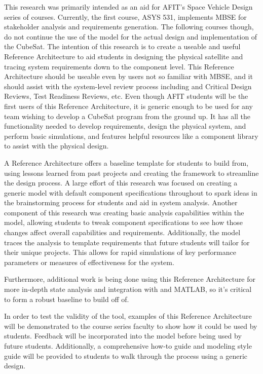 
This research was primarily intended as an aid for AFIT's Space Vehicle Design series of courses. Currently, the first course, ASYS 531, implements MBSE for stakeholder analysis and requirements generation. The following courses though, do not continue the use of the model for the actual design and implementation of the CubeSat. The intention of this research is to create a useable and useful Reference Architecture to aid students in designing the physical satellite and tracing system requirements down to the component level. This Reference Architecture should be useable even by users not so familiar with MBSE, and it should assist with the system-level review process including and Critical Design Reviews, Test Readiness Reviews, etc. Even though AFIT students will be the first users of this Reference Architecture, it is generic enough to be used for any team wishing to develop a CubeSat program from the ground up. It has all the functionality needed to develop requirements, design the physical system, and perform basic simulations, and features helpful resources like a component library to assist with the physical design. 

A Reference Architecture offers a baseline template for students to build from, using lessons learned from past projects and creating the framework to streamline the design process. A large effort of this research was focused on creating a generic model with default component specifications throughout to spark ideas in the brainstorming process for students and aid in system analysis. Another component of this research was creating basic analysis capabilities within the model, allowing students to tweak component specifications to see how those changes affect overall capabilities and requirements. Additionally, the model traces the analysis to template requirements that future students will tailor for their unique projects. This allows for rapid simulations of key performance parameters or measures of effectiveness for the system. 

Furthermore, additional work is being done using this Reference Architecture for more in-depth state analysis and integration with  and MATLAB, so it's critical to form a robust baseline to build off of.

In order to test the validity of the tool, examples of this Reference Architecture will be demonstrated to the course series faculty to show how it could be used by students. Feedback will be incorporated into the model before being used by future students. Additionally, a comprehensive how-to guide and modeling style guide will be provided to students to walk through the process using a generic design. 
